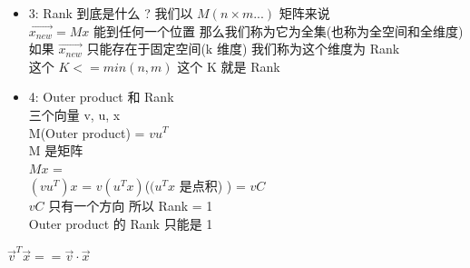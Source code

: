\documentclass[12pt]{article}
\begin{document}
\begin{flushleft}
\begin{itemize}
              设$ e2 = k \cdot e1 $ \\
              $\vec{e1}x  + \vec{e2}y$  =  $\vec{e1}x + \vec{e1}ny$  \\
              = $e1(x + ny)$ \\
              这个代数形式就 表达 N = 1 (only) 的存在情况 \\
        \item 3: Rank 到底是什么 ?
              我们以 $M(n \times m ...)$ 矩阵来说 \\
              $\vec{x_{new}} = Mx$ 能到任何一个位置 那么我们称为它为全集(也称为全空间和全维度) \\
              如果 $\vec{x_{new}}$ 只能存在于固定空间(k 维度) 我们称为这个维度为 Rank \\
              这个 $ K <= min(n,m)$ 这个 K 就是 Rank \\
        \item 4: Outer product 和 Rank \\
              三个向量 v, u, x \\
              M(Outer product) =  $vu^{T}$ \\
              M 是矩阵 \\
              $Mx$ = \\
              $(vu^{T})x$  = $v(u^{T}x)$($(u^{T}x$ 是点积) ) = $vC$ \\
              $vC$ 只有一个方向 所以 Rank = 1 \\
              Outer product 的 Rank 只能是 1
    \end{itemize}

    $\vec{v}^{T}\vec{x} == \vec{v} \cdot \vec{x}$
\end{flushleft}
\end{document}
